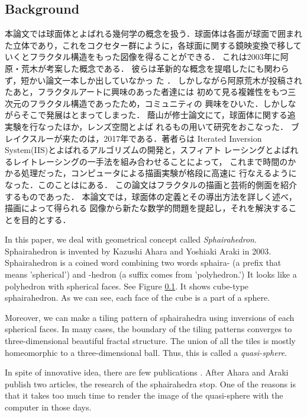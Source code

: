 \documentclass[dvipdfmx]{interact}
\theoremstyle{plain}%
\theoremstyle{definition}
\theoremstyle{remark}
\theoremstyle{problemstyle}
\begin{document}
\subsection{Background}

本論文では球面体とよばれる幾何学の概念を扱う．球面体は各面が球面で囲まれ
た立体であり，これをコクセター群にように，各球面に関する鏡映変換で移して
いくとフラクタル構造をもった図像を得ることができる．
これは2003年に阿原・荒木が考案した概念である．
彼らは革新的な概念を提唱したにも関わらず，短かい論文一本しか出していなかっ
た \cite{AharaAraki}．
しかしながら阿原荒木が投稿されたあと，フラクタルアートに興味のあった者達には
初めて見る複雑性をもつ三次元のフラクタル構造であったため，コミュニティの
興味をひいた．しかしながらそこで発展はとまってしまった．
蔭山が修士論文にて，球面体に関する追実験を行なったほか，レンズ空間とよば
れるもの用いて研究をおこなった．
ブレイクスルーが来たのは，2017年である．著者らは
Iterated Inversion System(IIS)とよばれるアルゴリズムの開発と，スフィアト
レーシングとよばれるレイトレーシングの一手法を組み合わせることによって，
これまで時間のかかる処理だった，コンピュータによる描画実験が格段に高速に
行なえるようになった．このことは\cite{bridges2018}にある．
この論文はフラクタルの描画と芸術的側面を紹介するものであった．
本論文では，球面体の定義とその導出方法を詳しく述べ，描画によって得られる
図像から新たな数学的問題を提起し，それを解決することを目的とする．


In this paper, we deal with geometrical concept called
\textit{Sphairahedron}. Sphairahedron is invented by Kazushi Ahara and
Yoshiaki Araki \cite{AharaAraki} in 2003. Sphairahedron is a coined word
combining two words sphaira- (a prefix that means 'spherical') and
-hedron (a suffix comes from 'polyhedron.') It looks like a polyhedron
with spherical faces. See Figure \ref{}. It shows cube-type
sphairahedron. As we can see, each face of the cube is a part of a
sphere.

Moreover, we can make a tiling pattern of sphairahedra using inversions
of each spherical faces. In many cases, the boundary of the tiling
patterns converges to three-dimensional beautiful fractal structure. 
The union of all the tiles is mostly homeomorphic to a three-dimensional
ball. Thus, this is called a \textit{quasi-sphere}.

In spite of innovative idea, there are few publications
\cite{AharaAraki}\cite{AharaJa}.
After Ahara and Araki publish two articles, the research of the
sphairahedra stop. 
One of the reasons is that it takes too much time to render the image of
the quasi-sphere with the computer in those days.
\end{document}
